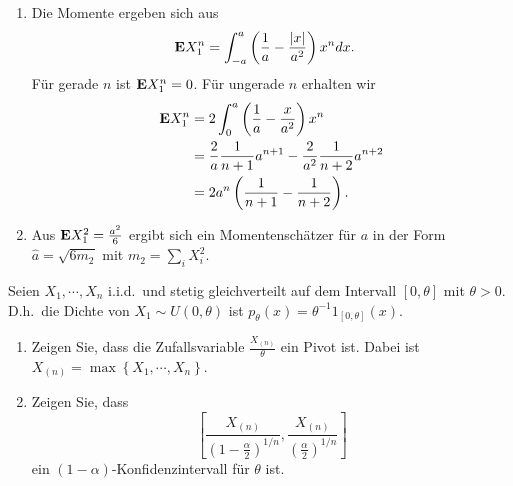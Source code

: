 \solution 
\begin{enumerate}
    \item Die Momente ergeben sich aus
        \begin{align*}
            \mathbf{E} X_1^n &= \int_{-a}^{a} \left( \frac{1}{a} - \frac{|x|}{a^2} \right) x^n dx.
        \end{align*}
        Für gerade $n$ ist $\mathbf{E} X_1^n=0$. Für ungerade $n$ erhalten wir
        \begin{align*}
            \mathbf{E} X_1^{n} &= 2 \int_{0}^{a} \left( \frac{1}{a} - \frac{x}{a^2} \right) x^{n} \\
            &= \frac{2}{a} \frac{1}{n+1} a^{n+1} - \frac{2}{a^2} \frac{1}{n+2}a^{n+2} \\
            &= 2 a^{n} \left( \frac{1}{n+1}- \frac{1}{n+2} \right).
        \end{align*}
    \item Aus $\mathbf{E} X_1^2 = \frac{a^2}{6}$ ergibt sich ein Momentenschätzer für
        $a$ in der Form $\hat a = \sqrt{6 m_2}$ mit $m_2 = \sum_{i}^{} X_i^2$. 
\end{enumerate}





 Seien $X_1, \cdots, X_n$
i.i.d.\ und stetig gleichverteilt auf dem Intervall $\left[ 0,\theta \right]$
mit $\theta>0$. D.h.\  die Dichte von $X_1\sim U(0,\theta)$ ist $p_\theta(x) = \theta^{-1}
1_{\left[ 0,\theta \right]}(x)$.
\begin{enumerate}
    \item Zeigen Sie, dass die Zufallsvariable $\frac{X_{\left( n \right)}}{\theta}$ ein
        Pivot ist. Dabei ist $X_{\left( n \right)} = \max \left\{ X_1, \cdots, X_n \right\}$. 
    \item Zeigen Sie, dass 
        \begin{equation*}
            \left[ \frac{X_{\left( n \right)}}{ \left( 1- \frac{\alpha}{2} \right)^{1/n}},
            \frac{X_{\left( n \right)}}{ \left( \frac{\alpha}{2} \right)^{1/n}}
            \right]
        \end{equation*}
        ein $(1-\alpha)$-Konfidenzintervall für $\theta$ ist. 
\end{enumerate}


